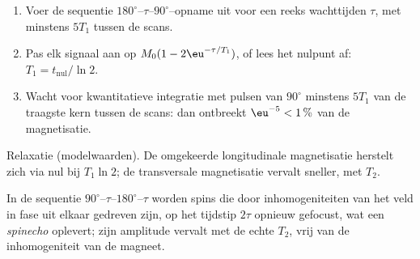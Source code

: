 \begin{method}\label{met:b3:advanced-nmr:t1}
\begin{enumerate}
  \item Voer de sequentie $180^\circ$--$\tau$--$90^\circ$--opname uit voor een
        reeks wachttijden
        $\tau$, met minstens $5T_1$ tussen de scans.
  \item Pas elk signaal aan op $M_0(1 - 2\eu^{-\tau/T_1})$, of lees het
        nulpunt af: $T_1 =
        t_{\mathrm{nul}}/\ln2$.
  \item Wacht voor kwantitatieve integratie met pulsen van $90^\circ$
        minstens $5T_1$ van de traagste kern tussen de scans: dan ontbreekt
        $\eu^{-5} < 1\,\%$ van de magnetisatie.
\end{enumerate}
\end{method}

\begin{omfigure}

{\small Relaxatie (modelwaarden). De omgekeerde longitudinale magnetisatie
herstelt zich via nul bij $T_1\ln2$; de transversale magnetisatie vervalt
sneller, met $T_2$.}
\end{omfigure}

\begin{definition}[Spinecho]\label{def:b3:advanced-nmr:echo}
In de sequentie $90^\circ$--$\tau$--$180^\circ$--$\tau$ worden spins die
door inhomogeniteiten van het veld in fase uit elkaar gedreven zijn, op
het tijdstip $2\tau$ opnieuw gefocust, wat een
\emph{spinecho} oplevert; zijn amplitude vervalt met de
echte $T_2$, vrij van
de inhomogeniteit van de magneet.
\end{definition}


